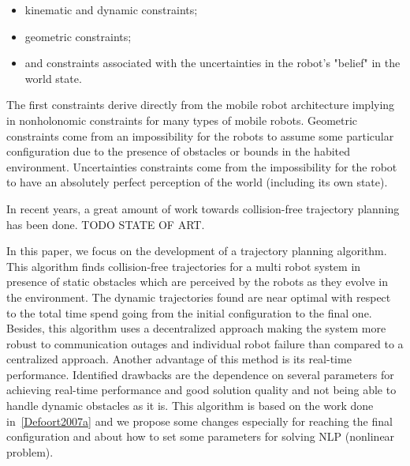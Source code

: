 \documentclass[eprint]{actapoly}
\begin{document}
\begin{itemize}

 \item kinematic and dynamic constraints;
 
 \item geometric constraints;
 
 \item and constraints associated with the uncertainties in the robot's "belief" in the world state.
 
\end{itemize}

The first constraints derive directly from the mobile robot architecture implying in nonholonomic constraints for many types of mobile robots.
Geometric constraints come from an impossibility for the robots to assume some particular configuration due to the presence of obstacles or bounds
in the habited environment.
Uncertainties constraints come from the impossibility for the robot to have an absolutely perfect perception of the world (including its own state).


In recent years, a great amount of work towards collision-free trajectory planning has been done.
TODO STATE OF ART.

In this paper, we focus on the development of a trajectory planning algorithm. This algorithm finds collision-free trajectories for
a multi robot system in presence of static obstacles which are perceived by the robots as they evolve in the environment.
The dynamic trajectories found are near optimal with respect to the total time spend going from the initial configuration to the final one.
Besides, this algorithm uses a decentralized approach making the system more robust to communication outages and individual robot failure than compared
to a centralized approach.
Another advantage of this method is its real-time performance.
Identified drawbacks are the dependence on several parameters for achieving real-time performance and good solution quality and not being able to handle
dynamic obstacles as it is.
This algorithm is based on the work done in~\ref{Defoort2007a} and we propose some changes especially for reaching the final configuration and about how
to set some parameters for solving NLP (nonlinear problem).

\end{document}
